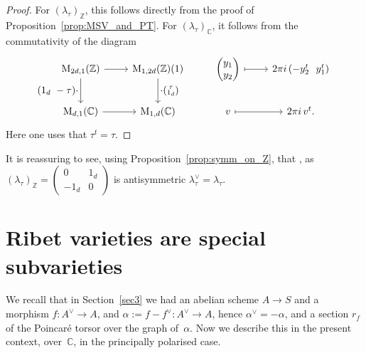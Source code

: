 \documentclass[JEP,XML,SOM,Unicode,NoFloatCountersInSection]{cedram}
\let\oldvee\vee
\renewcommand{\vee}{{\scriptscriptstyle\oldvee}}
\theoremstyle{plain}
\theoremstyle{definition}
\numberwithin{equation}{subsection}
\renewcommand{\C}{\mathbb C}
\newcommand{\Z}{\mathbb Z}
\newcommand{\rmM}{\mathrm{M}}
\begin{document}
\begin{proof}
For $(\lambda_\tau)_\Z$, this follows directly from the proof of
Proposition~\ref{prop:MSV_and_PT}. For $(\lambda_\tau)_\C$, it follows
from the commutativity of the diagram
\[
\begin{tikzcd}
\rmM_{2d,1}(\Z) \ar[r] \ar[d, "\textstyle(1_d\ -\tau){\cdot}"'] &
\rmM_{1,2d}(\Z)(1) \ar[d, "\textstyle{\cdot}(\substack{\tau\\ 1_d})"] &
\begin{pmatrix} y_1\\ y_2\end{pmatrix} \ar[r, mapsto]& 2\pi i\, (-y_2^t \ \ y_1^t)\\
\rmM_{d,1}(\C) \ar[r] & \rmM_{1,d}(\C) & v\ar[r, mapsto] & 2\pi i\, v^t.
\end{tikzcd}
\]
Here one uses that $\tau^t=\tau$.
\end{proof}
It is reassuring to see, using Proposition~\ref{prop:symm_on_Z}, that , as
$(\lambda_\tau)_\Z=(\begin{smallmatrix}0 & 1_d\\-1_d &
0\end{smallmatrix})$ is antisymmetric
$\lambda_\tau^\vee=\lambda_\tau$.

\section{Ribet varieties are special subvarieties}\label{sec5}
We recall that in Section~\ref{sec3} we had an abelian scheme $A\to S$
and a morphism $f\colon A^\vee\to A$, and $\alpha:=f-f^\vee\colon
A^\vee\to A$, hence $\alpha^\vee=-\alpha$, and a section $r_f$ of the
Poincaré torsor over the graph of~$\alpha$. Now we describe this in
the present context, over~$\C$, in the principally polarised case.
\end{document}
